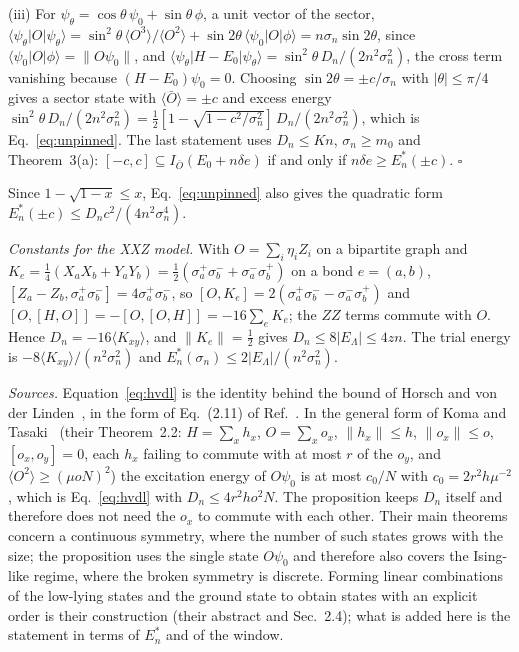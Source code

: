 \documentclass[aps,prx,onecolumn,10pt,nofootinbib,longbibliography,floatfix]{revtex4-2}
\theoremstyle{remark}
\newcommand{\de}{\delta e}
\begin{document}
(iii) For $\psi_\theta=\cos\theta\,\psi_0+\sin\theta\,\phi$, a unit vector of the sector,
$\langle\psi_\theta|O|\psi_\theta\rangle=\sin^2\theta\,\langle O^3\rangle/\langle O^2\rangle %
+\sin2\theta\,\langle\psi_0|O|\phi\rangle=n\sigma_n\sin2\theta$, since $\langle\psi_0|O|\phi\rangle=\|O\psi_0\|$, %
and $\langle\psi_\theta|H-E_0|\psi_\theta\rangle=\sin^2\theta\,D_n/(2n^2\sigma_n^2)$, the cross term vanishing
because $(H-E_0)\psi_0=0$. Choosing $\sin2\theta=\pm c/\sigma_n$ with $|\theta|\le\pi/4$ gives a sector state with
$\langle\bar O\rangle=\pm c$ and excess energy
$\sin^2\theta\,D_n/(2n^2\sigma_n^2)=\frac12[1-\sqrt{1-c^2/\sigma_n^2}]\,D_n/(2n^2\sigma_n^2)$, which is
Eq.~\eqref{eq:unpinned}. The last statement uses $D_n\le Kn$, $\sigma_n\ge m_0$ and Theorem~3(a): %
$[-c,c]\subseteq I_{\bar O}(E_0+n\de)$ if and only if $n\de\ge E^*_n(\pm c)$. \hfill$\square$

Since $1-\sqrt{1-x}\le x$, Eq.~\eqref{eq:unpinned} also gives the quadratic form
$E^*_n(\pm c)\le D_nc^2/(4n^2\sigma_n^4)$.

\emph{Constants for the XXZ model.} With $O=\sum_i\eta_iZ_i$ on a bipartite graph and
$K_e=\frac14(X_aX_b+Y_aY_b)=\frac12(\sigma^+_a\sigma^-_b+\sigma^-_a\sigma^+_b)$ on a bond $e=(a,b)$,
$[Z_a-Z_b,\sigma^+_a\sigma^-_b]=4\sigma^+_a\sigma^-_b$, so $[O,K_e]=2(\sigma^+_a\sigma^-_b-\sigma^-_a\sigma^+_b)$
and $[O,[H,O]]=-[O,[O,H]]=-16\sum_eK_e$; the $ZZ$ terms commute with $O$. Hence $D_n=-16\langle K_{xy}\rangle$, and %
$\|K_e\|=\frac12$ gives $D_n\le8|E_\Lambda|\le4zn$. The trial energy is $-8\langle K_{xy}\rangle/(n^2\sigma_n^2)$
and $E^*_n(\sigma_n)\le2|E_\Lambda|/(n^2\sigma_n^2)$.

\emph{Sources.} Equation~\eqref{eq:hvdl} is the identity behind the bound of Horsch and von der
Linden~\cite{horsch1988}, in the form of Eq.~(2.11) of Ref.~\cite{koma1994}. In the %
general form of Koma and Tasaki~\cite{koma1994} (their Theorem~2.2: $H=\sum_xh_x$, $O=\sum_xo_x$, $\|h_x\|\le h$, %
$\|o_x\|\le o$, $[o_x,o_y]=0$, each $h_x$ failing to commute with at most $r$ of the $o_y$, and
$\langle O^2\rangle\ge(\mu oN)^2$) the excitation energy of $O\psi_0$ is at most $c_0/N$ with $c_0=2r^2h\mu^{-2}$,
which is Eq.~\eqref{eq:hvdl} with $D_n\le4r^2ho^2N$. The proposition keeps $D_n$ itself and therefore does not
need the $o_x$ to commute with each other. Their main theorems concern a continuous symmetry, where the number of
such states grows with the size; the proposition uses the single state $O\psi_0$ and therefore also covers the
Ising-like regime, where the broken symmetry is discrete. Forming linear combinations of the low-lying states and
the ground state to obtain states with an explicit order is their construction (their abstract and Sec.~2.4); %
what is added here is the statement in terms of $E^*_n$ and of the window.
\end{document}
